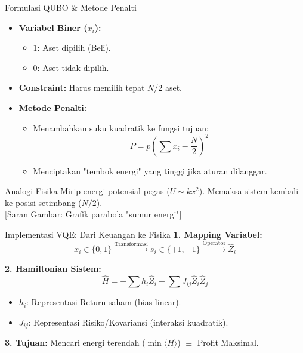 \documentclass[10pt]{beamer}
\begin{document}
\begin{frame}{Formulasi QUBO \& Metode Penalti}
    \begin{itemize}
        \item \textbf{Variabel Biner ($x_i$):}
        \begin{itemize}
            \item $1$: Aset dipilih (Beli).
            \item $0$: Aset tidak dipilih.
        \end{itemize}
        \item \textbf{Constraint:} Harus memilih tepat $N/2$ aset.
        \item \textbf{Metode Penalti:}
        \begin{itemize}
            \item Menambahkan suku kuadratik ke fungsi tujuan:
            \[ P = p \left( \sum x_i - \frac{N}{2} \right)^2 \]
            \item Menciptakan "tembok energi" yang tinggi jika aturan dilanggar.
        \end{itemize}
    \end{itemize}

    \vspace{0.3cm}
    \begin{alertblock}{Analogi Fisika}
        \centering
        Mirip energi potensial pegas ($U \sim kx^2$). Memaksa sistem kembali ke posisi setimbang ($N/2$).
        \\ \footnotesize{[Saran Gambar: Grafik parabola "sumur energi"]}
    \end{alertblock}
\end{frame}

\begin{frame}{Implementasi VQE: Dari Keuangan ke Fisika}
    \textbf{1. Mapping Variabel:}
    \[ x_i \in \{0,1\} \xrightarrow{\text{Transformasi}} s_i \in \{+1,-1\} \xrightarrow{\text{Operator}} \hat{Z}_i \]
    
    \vspace{0.3cm}
    \textbf{2. Hamiltonian Sistem:}
    \[ \hat{H} = -\sum h_i \hat{Z}_i - \sum J_{ij} \hat{Z}_i \hat{Z}_j \]
    \begin{itemize}
        \item $h_i$: Representasi Return saham (bias linear).
        \item $J_{ij}$: Representasi Risiko/Kovariansi (interaksi kuadratik).
    \end{itemize}
    
    \vspace{0.3cm}
    \textbf{3. Tujuan:} 
    Mencari energi terendah ($\min \langle H \rangle$) $\equiv$ Profit Maksimal.
\end{frame}
\end{document}
